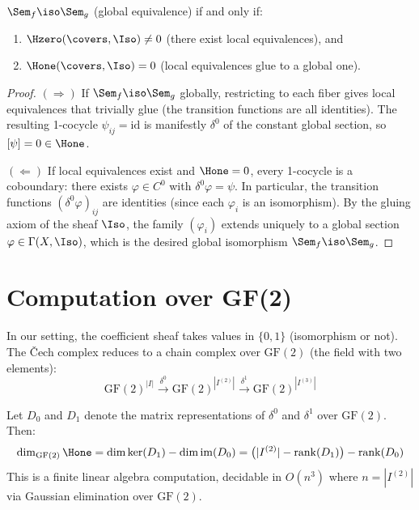 \begin{theorem}
\label{thm:descent-full}
$\Sem_f \iso \Sem_g$ (global equivalence) if and only if:
\begin{enumerate}
  \item $\Hzero(\covers, \Iso) \neq 0$ (there exist local equivalences), and
  \item $\Hone(\covers, \Iso) = 0$ (local equivalences glue to a
    global one).
\end{enumerate}
\end{theorem}

\begin{proof}
$(\Rightarrow)$ If $\Sem_f \iso \Sem_g$ globally, restricting to
each fiber gives local equivalences that trivially glue (the
transition functions are all identities).  The resulting 1-cocycle
$\psi_{ij} = \mathrm{id}$ is manifestly $\delta^0$ of the constant
global section, so $[\psi] = 0 \in \Hone$.

$(\Leftarrow)$ If local equivalences exist and $\Hone = 0$, every
1-cocycle is a coboundary: there exists $\varphi \in C^0$ with
$\delta^0 \varphi = \psi$.  In particular, the transition functions
$(\delta^0 \varphi)_{ij}$ are identities (since each $\varphi_i$ is
an isomorphism).  By the gluing axiom of the sheaf $\Iso$, the
family $(\varphi_i)$ extends uniquely to a global section
$\varphi \in \Gamma(X, \Iso)$, which is the desired global
isomorphism $\Sem_f \iso \Sem_g$.
\end{proof}

\section{Computation over GF(2)}

In our setting, the coefficient sheaf takes values in $\{0, 1\}$
(isomorphism or not).  The \v{C}ech complex reduces to a chain
complex over $\mathrm{GF}(2)$ (the field with two elements):
\[
  \mathrm{GF}(2)^{|I|} \xrightarrow{\delta^0}
  \mathrm{GF}(2)^{|I^{(2)}|} \xrightarrow{\delta^1}
  \mathrm{GF}(2)^{|I^{(3)}|}
\]

\begin{proposition}
\label{prop:h1-rank}
Let $D_0$ and $D_1$ denote the matrix representations of $\delta^0$
and $\delta^1$ over $\mathrm{GF}(2)$.  Then:
\[
  \dim_{\mathrm{GF}(2)} \Hone
  = \dim \ker(D_1) - \dim \mathrm{im}(D_0)
  = \bigl(|I^{(2)}| - \mathrm{rank}(D_1)\bigr) - \mathrm{rank}(D_0)
\]
This is a finite linear algebra computation, decidable in
$O(n^3)$ where $n = |I^{(2)}|$ via Gaussian elimination over
$\mathrm{GF}(2)$.
\end{proposition}

